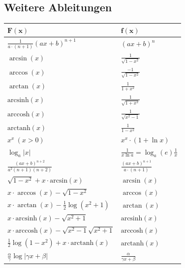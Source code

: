 \documentclass[a4paper,10pt]{article}
\begin{document}
    \subsection{Weitere Ableitungen}
    \begin{center}
        \begin{tabularx}{\linewidth}{>{\centering\arraybackslash}X>{\centering\arraybackslash}X}
            \toprule
            $\mathbf{F(x)}$                                     & $\mathbf{f(x)}$                          \\
            \midrule
            $\frac{1}{a\cdot (n+1)}(ax+b)^{n+1}$                & $(ax+b)^n$                               \\
                
            $\arcsin(x)$                                        & $\frac{1}{\sqrt{1 - x^2}}$               \\
            $\arccos(x)$                                        & $\frac{-1}{\sqrt{1 - x^2}}$              \\
            $\arctan(x)$                                        & $\frac{1}{1 + x^2}$                      \\ 
            $\text{arcsinh}(x)$                                 & $\frac{1}{\sqrt{1 + x^2}}$               \\
            $\text{arccosh}(x) $                                & $\frac{1}{\sqrt{x^2 - 1}}$               \\
            $\text{arctanh}(x) $                                & $\frac{1}{1 - x^2}$                      \\ 
            $x^x \ (x > 0)$                                     & $x^x \cdot (1 + \ln x)$                  \\
            $\log_a|x|$                                         & $\frac{1}{x \ln a}=\log_a(e)\frac{1}{x}$ \\
            $\frac{(ax+b)^{n+2}}{a^2(n+1)(n+2)}$                & $\frac{(ax+b)^{n+1}}{a\cdot (n+1)}$      \\
            $\sqrt{1-x^2}+x\cdot \text{arcsin}(x)$              & $\arcsin(x)$                             \\
            $x\cdot \arccos(x)-\sqrt{1-x^2}$                    & $\arccos(x)$                             \\
            $x\cdot \arctan(x)-\frac{1}{2} \log(x^2+1)$         & $\arctan(x)$                             \\ 
            $x\cdot \text{arcsinh}(x)-\sqrt{x^2+1}$             & $\text{arcsinh}(x)$                      \\
            $x\cdot \text{arccosh}(x)-\sqrt{x^2-1}\sqrt{x^2+1}$ & $\text{arccosh}(x)$                      \\
            $\frac{1}{2} \log(1-x^2)+x\cdot \text{arctanh}(x)$  & $\text{arctanh}(x)$                      \\ 
            $\frac{\alpha}{\gamma}\log|\gamma x+\beta|$         & $\frac{\alpha}{\gamma x+\beta}$          \\ 
            \bottomrule
        \end{tabularx}
    \end{center}
    
\end{document}
